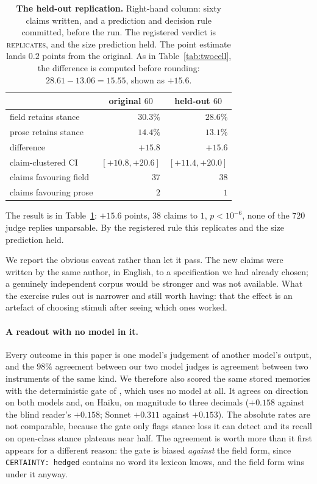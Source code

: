 \documentclass[11pt]{article}
\begin{document}
\begin{table}[t]
\centering\small
\begin{tabular}{@{}l r r@{}}
\toprule
& \multicolumn{1}{c}{original $60$} & \multicolumn{1}{c}{held-out $60$} \\
\midrule
field retains stance   & $30.3\%$ & $28.6\%$ \\
prose retains stance   & $14.4\%$ & $13.1\%$ \\
difference             & $+15.8$  & $+15.6$ \\
claim-clustered CI     & $[+10.8, +20.6]$ & $[+11.4, +20.0]$ \\
claims favouring field & $37$ & $38$ \\
claims favouring prose & $2$ & $1$ \\
\bottomrule
\end{tabular}
\caption{\textbf{The held-out replication.} Right-hand column: sixty claims written, and
a prediction and decision rule committed, before the run. The registered verdict is
\textsc{replicates}, and the size prediction held. The point estimate lands $0.2$ points
from the original. As in Table~\ref{tab:twocell}, the difference is computed before
rounding: $28.61-13.06=15.55$, shown as $+15.6$.}
\label{tab:prereg}
\end{table}

The result is in Table~\ref{tab:prereg}: $+15.6$ points, $38$ claims to $1$,
$p<10^{-6}$, none of the $720$ judge replies unparsable. By the registered rule this
replicates and the size prediction held.

We report the obvious caveat rather than let it pass. The new claims were written by the
same author, in English, to a specification we had already chosen; a genuinely
independent corpus would be stronger and was not available. What the exercise rules out
is narrower and still worth having: that the effect is an artefact of choosing stimuli
after seeing which ones worked.

\paragraph{A readout with no model in it.} Every outcome in this paper is one model's
judgement of another model's output, and the $98\%$ agreement between our two model
judges is agreement between two instruments of the same kind. We therefore also scored
the same stored memories with the deterministic gate of \citet{kwon2026factwash}, which
uses no model at all. It agrees on direction on both models and, on Haiku, on magnitude
to three decimals ($+0.158$ against the blind reader's $+0.158$; Sonnet $+0.311$ against
$+0.153$). The absolute rates are not comparable, because the gate only flags stance loss
it can detect and its recall on open-class stance plateaus near half. The agreement is
worth more than it first appears for a different reason: the gate is biased \emph{against}
the field form, since \texttt{CERTAINTY: hedged} contains no word its lexicon knows, and
the field form wins under it anyway.
\end{document}
